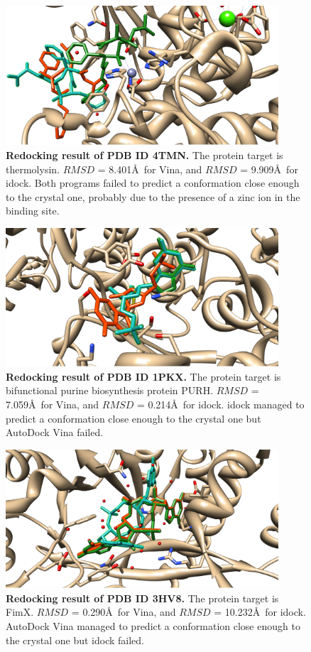 \documentclass[10pt]{article}
\begin{document}
\begin{figure}[!ht]
\begin{center}
\includegraphics[width=4in]{Redocking4TMN.eps}
\end{center}
\caption{
{\bf Redocking result of PDB ID 4TMN.} The protein target is thermolysin. $RMSD$ = 8.401\AA\ for Vina, and $RMSD$ = 9.909\AA\ for idock. Both programs failed to predict a conformation close enough to the crystal one, probably due to the presence of a zinc ion in the binding site.
}
\label{Redocking4TMN}
\end{figure}

\begin{figure}[!ht]
\begin{center}
\includegraphics[width=4in]{Redocking1PKX.eps}
\end{center}
\caption{
{\bf Redocking result of PDB ID 1PKX.} The protein target is bifunctional purine biosynthesis protein PURH. $RMSD$ = 7.059\AA\ for Vina, and $RMSD$ = 0.214\AA\ for idock. idock managed to predict a conformation close enough to the crystal one but AutoDock Vina failed.
}
\label{Redocking1PKX}
\end{figure}

\begin{figure}[!ht]
\begin{center}
\includegraphics[width=4in]{Redocking3HV8.eps}
\end{center}
\caption{
{\bf Redocking result of PDB ID 3HV8.} The protein target is FimX. $RMSD$ = 0.290\AA\ for Vina, and $RMSD$ = 10.232\AA\ for idock. AutoDock Vina managed to predict a conformation close enough to the crystal one but idock failed.
}
\label{Redocking3HV8}
\end{figure}
\end{document}

